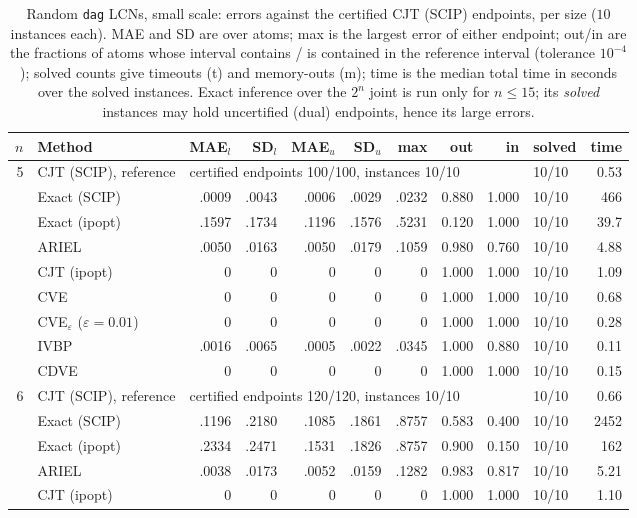 \begin{table}[htbp]
\centering
\scriptsize
\caption{Random \texttt{dag} LCNs, small scale: errors against the certified CJT (SCIP) endpoints, per size ($10$ instances each). MAE and SD are over atoms; max is the largest error of either endpoint; out/in are the fractions of atoms whose interval contains / is contained in the reference interval (tolerance $10^{-4}$); solved counts give timeouts (t) and memory-outs (m); time is the median total time in seconds over the solved instances. Exact inference over the $2^n$ joint is run only for $n \le 15$; its \emph{solved} instances may hold uncertified (dual) endpoints, hence its large errors.}
\label{tab:full-dag-small}
\begin{tabular}{rlrrrrrrrlr}
\toprule
$n$ & Method & MAE$_l$ & SD$_l$ & MAE$_u$ & SD$_u$ & max & out & in & solved & time \\
\midrule
5 & CJT (SCIP), reference & \multicolumn{7}{l}{certified endpoints 100/100, instances 10/10} & 10/10 & 0.53 \\
 & Exact (SCIP) & .0009 & .0043 & .0006 & .0029 & .0232 & 0.880 & 1.000 & 10/10 & 466 \\
 & Exact (ipopt) & .1597 & .1734 & .1196 & .1576 & .5231 & 0.120 & 1.000 & 10/10 & 39.7 \\
 & ARIEL & .0050 & .0163 & .0050 & .0179 & .1059 & 0.980 & 0.760 & 10/10 & 4.88 \\
 & CJT (ipopt) & 0 & 0 & 0 & 0 & 0 & 1.000 & 1.000 & 10/10 & 1.09 \\
 & CVE & 0 & 0 & 0 & 0 & 0 & 1.000 & 1.000 & 10/10 & 0.68 \\
 & CVE$_\varepsilon$ ($\varepsilon{=}0.01$) & 0 & 0 & 0 & 0 & 0 & 1.000 & 1.000 & 10/10 & 0.28 \\
 & IVBP & .0016 & .0065 & .0005 & .0022 & .0345 & 1.000 & 0.880 & 10/10 & 0.11 \\
 & CDVE & 0 & 0 & 0 & 0 & 0 & 1.000 & 1.000 & 10/10 & 0.15 \\
\midrule
6 & CJT (SCIP), reference & \multicolumn{7}{l}{certified endpoints 120/120, instances 10/10} & 10/10 & 0.66 \\
 & Exact (SCIP) & .1196 & .2180 & .1085 & .1861 & .8757 & 0.583 & 0.400 & 10/10 & 2452 \\
 & Exact (ipopt) & .2334 & .2471 & .1531 & .1826 & .8757 & 0.900 & 0.150 & 10/10 & 162 \\
 & ARIEL & .0038 & .0173 & .0052 & .0159 & .1282 & 0.983 & 0.817 & 10/10 & 5.21 \\
 & CJT (ipopt) & 0 & 0 & 0 & 0 & 0 & 1.000 & 1.000 & 10/10 & 1.10 \\

\end{tabular}
\end{table}

